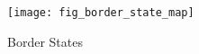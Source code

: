 \documentclass[aspectratio = 169]{beamer}
\begin{document}
%
%
%

%        
    \begin{frame}
        \hypertarget{fig:border-states}{}
        \begin{figure}
            \centering
            \texttt{[image: fig\_border\_state\_map]}
            \caption{Border States}
            \label{fig:border-state-map}
        \end{figure}
        \hyperlink{Border States}{}
        \fontsize{9}{11}\selectfont
    \end{frame}
\end{document}
